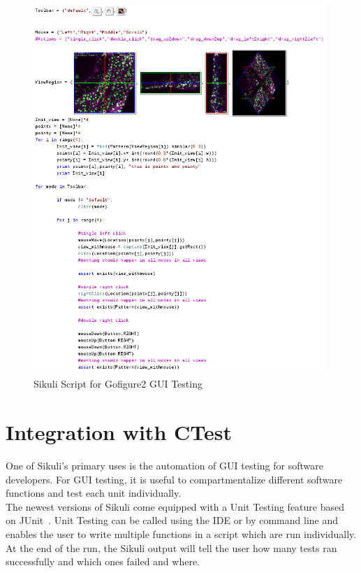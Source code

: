 \documentclass{InsightArticle}
\begin{document}
\begin{figure}[htp]
 \centering
 \includegraphics[width=0.99\textwidth]{Images/Gofigure2Example.png}
 \caption{Sikuli Script for Gofigure2 GUI Testing}
 \label{fig:Gofigure2Example}
\end{figure}

\section{Integration with CTest}

One of Sikuli's primary uses is the automation of GUI testing for software
developers. For GUI testing, it is useful to compartmentalize different software
functions and test each unit individually.\\

The newest versions of Sikuli come equipped with a Unit Testing feature based
on JUnit~\cite{JUnit:Website}. Unit Testing can be called using the IDE or by
command line and enables the user to write multiple functions in a script which
are run individually. At the end of the run, the Sikuli output will tell the
user how many tests ran successfully and which ones failed and where.\\
\end{document}
